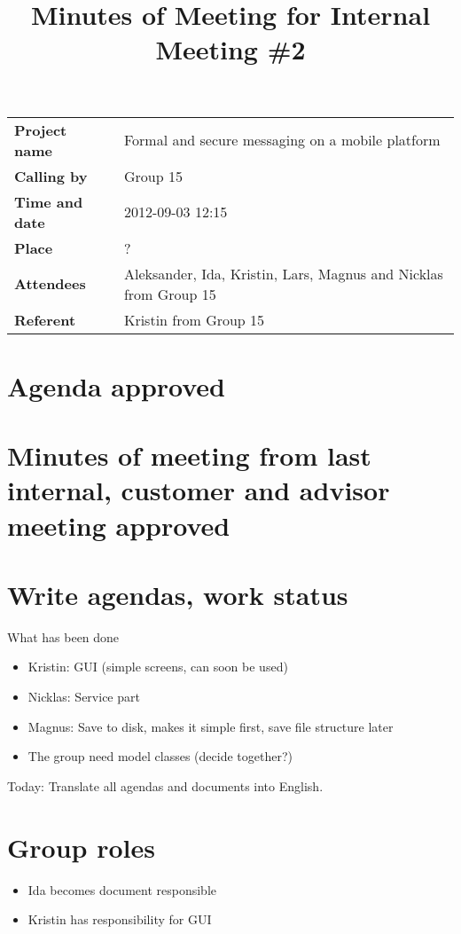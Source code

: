 \documentclass[a4paper,12pt]{article}
\begin{document}
\title{Minutes of Meeting for Internal Meeting \#2}
\maketitle
\begin{tabular}{>{\bfseries}l l}	
Project name&Formal and secure messaging on a mobile platform\\
Calling by&Group 15\\
Time and date&2012-09-03 12:15\\
Place&?\\
Attendees&Aleksander, Ida, Kristin, Lars, Magnus and Nicklas from Group 15\\
Referent&Kristin from Group 15\\
\end{tabular}

\section{Agenda approved}
\section{Minutes of meeting from last internal, customer and advisor meeting approved}
\section{Write agendas, work status}
What has been done
\begin{itemize}
\item
Kristin: GUI (simple screens, can soon be used)
\item
Nicklas: Service part
\item
Magnus: Save to disk, makes it simple first, save file structure later
\item
The group need model classes (decide together?)
\end{itemize}
Today: Translate all agendas and documents into English.
\section{Group roles}
\begin{itemize}
\item
Ida becomes document responsible
\item
Kristin has responsibility for GUI
\end{itemize}
\end{document}
